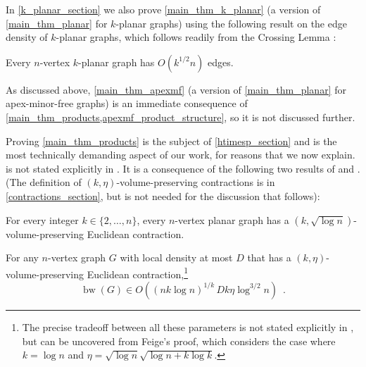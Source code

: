 \documentclass{patmorin}
\DeclareMathOperator{\bw}{bw}
\begin{document}
In \cref{k_planar_section} we also prove \cref{main_thm_k_planar} (a version of \cref{main_thm_planar} for $k$-planar graphs) using the following result on the edge density of $k$-planar graphs, which follows readily from the Crossing Lemma \cite{ajtai.chvatal.ea:crossing_free}:

\begin{lem}\label{k_planar_density}
  Every $n$-vertex $k$-planar graph has $O(k^{1/2} n)$ edges.
\end{lem}





%

As discussed above, \cref{main_thm_apexmf} (a version of \cref{main_thm_planar} for apex-minor-free graphs) is an immediate consequence of \cref{main_thm_products,apexmf_product_structure}, so it is not discussed further.

Proving \cref{main_thm_products} is the subject of \cref{htimesp_section} and is the most technically demanding aspect of our work, for reasons that we now explain.
 is not stated explicitly in \cite{rao:small}.  It is a consequence of the following two results of \citet{feige:approximating} and \citet{rao:small}. (The definition of $(k,\eta)$-volume-preserving contractions is in \cref{contractions_section}, but is not needed for the  discussion that follows):

\begin{thm}\label{rao_planar_graphs}
    For every integer $k\in\{2,\ldots,n\}$, every $n$-vertex planar graph has a $(k,\sqrt{\log n})$-volume-preserving Euclidean contraction.
\end{thm}

\begin{thm}\label{feige_bandwidth_vs_density_graphs}
    For any $n$-vertex graph $G$ with local density at most $D$ that has a $(k,\eta)$-volume-preserving Euclidean contraction,\footnote{The precise tradeoff between all these parameters is not stated explicitly in \cite{feige:approximating}, but can be uncovered from Feige's proof, which considers the case where $k=\log n$ and $\eta=\sqrt{\log n}\sqrt{\log n+ k\log k}$.}
    \[
        \bw(G) \in O((nk\log n)^{1/k}\,Dk\eta\log^{3/2} n) \enspace .
    \]
\end{thm}
\end{document}
